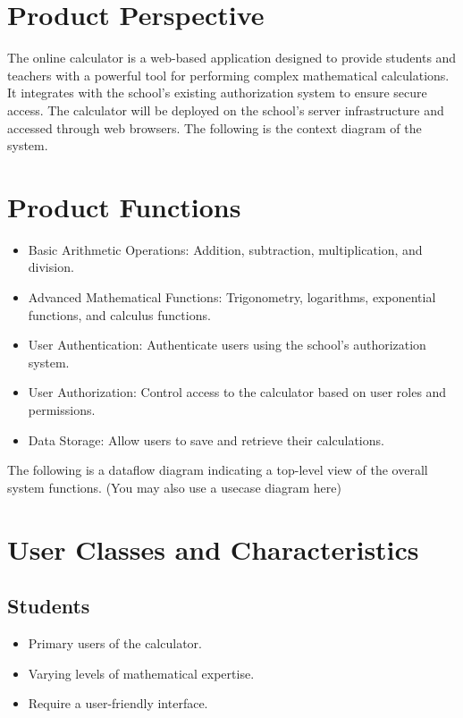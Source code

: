 \documentclass{scrreprt}
\begin{document}
\section{Product Perspective}
The online calculator is a web-based application designed to provide students and teachers with a powerful tool for performing complex mathematical calculations. It integrates with the school's existing authorization system \cite{hufs} to ensure secure access. The calculator will be deployed on the school's server infrastructure and accessed through web browsers. The following is the context diagram of the system.

\begin{center}

\end{center}

\section{Product Functions}
\begin{itemize}
    \item Basic Arithmetic Operations: Addition, subtraction, multiplication, and division.
    \item Advanced Mathematical Functions: Trigonometry, logarithms, exponential functions, and calculus functions.   
    \item User Authentication: Authenticate users using the school's authorization system.
    \item User Authorization: Control access to the calculator based on user roles and permissions.
    \item Data Storage: Allow users to save and retrieve their calculations.
\end{itemize}
The following is a dataflow diagram indicating a top-level view of the overall system functions. (You may also use a usecase diagram here)

\begin{center}

\end{center}

\section{User Classes and Characteristics}
\subsection*{Students}
\begin{itemize}
    \item Primary users of the calculator.
    \item Varying levels of mathematical expertise.
    \item Require a user-friendly interface.
\end{itemize}
\end{document}
